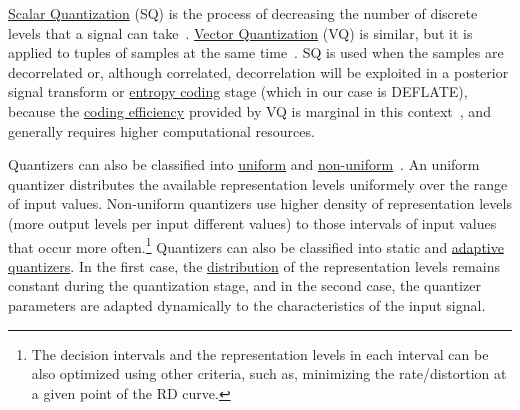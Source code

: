\href{https://en.wikipedia.org/wiki/Quantization_(signal_processing)}{Scalar
  Quantization} (SQ) is the process of decreasing the number of
discrete levels that a signal can
take~\cite{sayood2017introduction}. \href{https://en.wikipedia.org/wiki/Vector_quantization}{Vector
  Quantization} (VQ) is similar, but it is applied to tuples of
samples at the same time~\cite{vetterli2014foundations}. SQ is used
when the samples are decorrelated or, although correlated,
decorrelation will be exploited in a posterior signal transform or
\href{https://en.wikipedia.org/wiki/Entropy_encoding}{entropy coding}
stage (which in our case is DEFLATE), because the
\href{https://en.wikipedia.org/wiki/Quantization_(signal_processing)#Rate%E2%80%93distortion_optimization}{coding
  efficiency} provided by VQ is marginal in this
context~\cite{vetterli2014foundations}, and generally requires higher
computational resources.

Quantizers can also be classified into
\href{https://en.wikipedia.org/wiki/Quantization_(signal_processing)#Mid-riser_and_mid-tread_uniform_quantizers}{uniform}
and
\href{https://nptel.ac.in/content/storage2/courses/117104069/chapter_5/5_5.html}{non-uniform}~\cite{sayood2017introduction,vetterli2014foundations}. An
uniform quantizer distributes the available representation levels
uniformely over the range of input values. Non-uniform quantizers use
higher density of representation levels (more output levels per input
different values) to those intervals of input values that occur more
often.\footnote{The decision intervals and the representation levels
  in each interval can be also optimized using other criteria, such
  as, minimizing the rate/distortion at a given point of the RD
  curve.} Quantizers can also be classified into static
and
\href{https://en.wikipedia.org/wiki/Adaptive_differential_pulse-code_modulation}{adaptive
  quantizers}. In the first case, the
\href{https://en.wikipedia.org/wiki/Probability_distribution}{distribution}
of the representation levels remains constant during the quantization
stage, and in the second case, the quantizer parameters are adapted
dynamically to the characteristics of the input signal.

